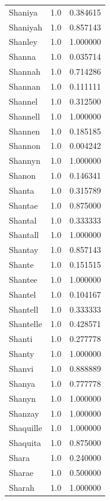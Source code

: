 \documentclass[
  letterpaper,
  DIV=11,
  numbers=noendperiod]{scrreprt}
\begin{document}
\begin{tabular}{lrr}
Shaniya         &   1.0 &   0.384615 \\
Shaniyah        &   1.0 &   0.857143 \\
Shanley         &   1.0 &   1.000000 \\
Shanna          &   1.0 &   0.035714 \\
Shannah         &   1.0 &   0.714286 \\
Shannan         &   1.0 &   0.111111 \\
Shannel         &   1.0 &   0.312500 \\
Shannell        &   1.0 &   1.000000 \\
Shannen         &   1.0 &   0.185185 \\
Shannon         &   1.0 &   0.004242 \\
Shannyn         &   1.0 &   1.000000 \\
Shanon          &   1.0 &   0.146341 \\
Shanta          &   1.0 &   0.315789 \\
Shantae         &   1.0 &   0.875000 \\
Shantal         &   1.0 &   0.333333 \\
Shantall        &   1.0 &   1.000000 \\
Shantay         &   1.0 &   0.857143 \\
Shante          &   1.0 &   0.151515 \\
Shantee         &   1.0 &   1.000000 \\
Shantel         &   1.0 &   0.104167 \\
Shantell        &   1.0 &   0.333333 \\
Shantelle       &   1.0 &   0.428571 \\
Shanti          &   1.0 &   0.277778 \\
Shanty          &   1.0 &   1.000000 \\
Shanvi          &   1.0 &   0.888889 \\
Shanya          &   1.0 &   0.777778 \\
Shanyn          &   1.0 &   1.000000 \\
Shanzay         &   1.0 &   1.000000 \\
Shaquille       &   1.0 &   1.000000 \\
Shaquita        &   1.0 &   0.875000 \\
Shara           &   1.0 &   0.240000 \\
Sharae          &   1.0 &   0.500000 \\
Sharah          &   1.0 &   1.000000 \\

\end{tabular}
\end{document}
